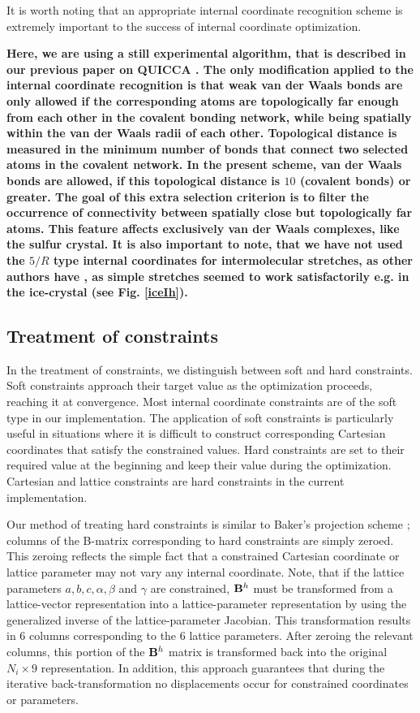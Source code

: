 \twolinestyle{\documentclass[prb,preprint]{revtex4}}
\begin{document}
It is worth noting that an appropriate internal coordinate 
recognition scheme is extremely important to the success of internal 
coordinate optimization.  
{\bf Here, we are using a still experimental algorithm, that is described
in our previous paper on QUICCA \cite{KNemeth04}. The only modification
applied to the internal coordinate recognition is that
weak van der Waals bonds are only allowed if the corresponding atoms
are topologically far enough from each other 
in the covalent bonding
network, while being spatially within the van der Waals radii of 
each other. Topological distance is measured in the minimum number
of bonds that connect two selected atoms in the covalent network.
In the present scheme, van der Waals bonds are allowed, if this 
topological distance is $10$ (covalent bonds) or greater.
The goal
of this extra selection criterion is to filter the occurrence of
connectivity between spatially close but topologically far atoms.
This feature affects exclusively van der Waals complexes, like the sulfur crystal. 
It is also important to note, that we have not used the $5/R$ type
internal coordinates for intermolecular stretches, as other authors have \cite{JBaker00,TBucko05},
as simple stretches seemed to work satisfactorily e.g. in the ice-crystal (see Fig. \ref{iceIh}). 

}

\subsection{Treatment of constraints}

In the treatment of  constraints, we distinguish between soft and hard constraints.
Soft constraints approach their target value as the optimization proceeds,  reaching it at 
convergence.  Most internal coordinate constraints are of the soft type in our implementation. 
The application of soft constraints is particularly useful in situations where it is difficult
to construct corresponding Cartesian coordinates that satisfy the constrained values.
Hard constraints are set to their required value  at the beginning and keep their value during 
the optimization.  Cartesian  and lattice constraints are hard constraints in the current 
implementation. 

Our method of treating hard constraints is similar to Baker's projection scheme \cite{JBaker96};  
columns of the B-matrix corresponding to hard constraints are simply zeroed. 
This zeroing reflects the simple fact that a constrained Cartesian coordinate or
lattice parameter may not vary any internal coordinate.
Note, that if the lattice parameters $a, b, c, \alpha, \beta$ and $\gamma$ are constrained, 
${\bf B}^h$ must be transformed from a lattice-vector representation into a lattice-parameter 
representation by using the generalized inverse of the lattice-parameter Jacobian. 
This transformation results in 6 columns corresponding to the 6 lattice parameters. 
After zeroing the relevant columns, this portion of the ${\bf B}^h$ matrix is transformed back 
into the original $N_i \times 9$ representation.   In addition, this approach
guarantees that during the iterative back-transformation no displacements occur 
for constrained coordinates or parameters.
\end{document}
